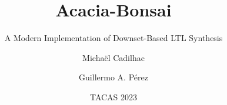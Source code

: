 \documentclass[aspectratio=169]{beamer}
\title{Acacia-Bonsai}
\subtitle{A Modern Implementation of Downset-Based LTL Synthesis}
\author{Micha\"el Cadilhac \and Guillermo A. P\'erez}
\date{TACAS 2023}
\begin{document}
\begin{frame}
	\titlepage
\end{frame}

\end{document}
